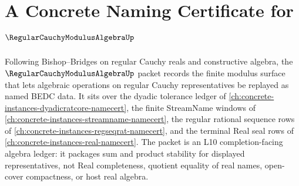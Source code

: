 \chapter{A Concrete Naming Certificate for $\RegularCauchyModulusAlgebraUp$}
\label{ch:concrete-instances-regular-cauchy-modulus-algebra-namecert}

Following Bishop--Bridges on regular Cauchy reals and constructive algebra, the $\RegularCauchyModulusAlgebraUp$ packet records the finite modulus surface that lets algebraic operations on regular Cauchy representatives be replayed as named BEDC data. It sits over the dyadic tolerance ledger of \autoref{ch:concrete-instances-dyadicratcore-namecert}, the finite StreamName windows of \autoref{ch:concrete-instances-streamname-namecert}, the regular rational sequence rows of \autoref{ch:concrete-instances-regseqrat-namecert}, and the terminal Real seal rows of \autoref{ch:concrete-instances-real-namecert}. The packet is an L10 completion-facing algebra ledger: it packages sum and product stability for displayed representatives, not Real completeness, quotient equality of real names, open-cover compactness, or host real algebra.

